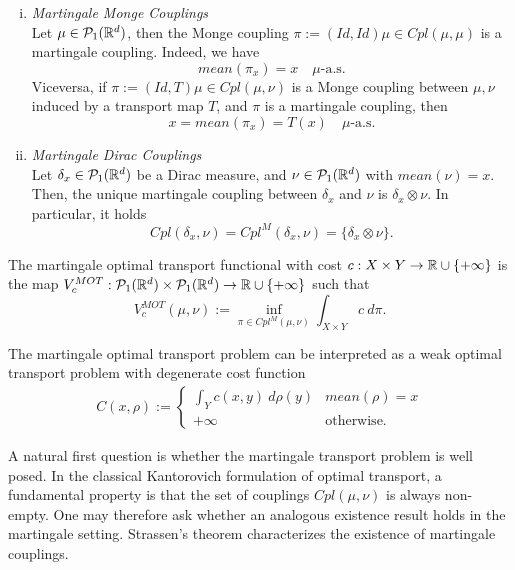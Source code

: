 \documentclass[../main.tex]{subfiles}
\begin{document}
\begin{example} \hfill
    \begin{enumerate}[(i)]
        \item \textit{Martingale Monge Couplings} \\
        Let $\mu\in\mathcal{P}_1(\mathbb{R}^d)$, then the Monge coupling $\pi:=(Id, Id)\mu\in Cpl(\mu, \mu)$ is a martingale coupling. Indeed, we have
        $$
        mean(\pi_x) = x \quad \mu\text{-a.s.}
        $$
        Viceversa, if $\pi:=(Id, T)\mu\in Cpl(\mu, \nu)$ is a Monge coupling between $\mu, \nu$ induced by a transport map $T$, and $\pi$ is a martingale coupling, then
        $$
        x = mean(\pi_x) = T(x) \quad \mu\text{-a.s.}
        $$
        \item \textit{Martingale Dirac Couplings} \\
        Let $\delta_x\in\mathcal{P}_1(\mathbb{R}^d)$ be a Dirac measure, and $\nu\in\mathcal{P}_1(\mathbb{R}^d)$ with $mean(\nu)=x$. Then, the unique martingale coupling between $\delta_x$ and $\nu$ is $\delta_x\otimes\nu$. In particular, it holds
        $$
        Cpl(\delta_x, \nu) = Cpl^M(\delta_x, \nu) = \{\delta_x \otimes\nu\}.
        $$
    \end{enumerate}
\end{example}

\begin{definition}
    The martingale optimal transport functional with  cost $c : X \times Y \to \mathbb{R}\cup\{+\infty\}$ is the map $V^{MOT}_c : \mathcal{P}_1(\mathbb{R}^d)\times\mathcal{P}_1(\mathbb{R}^d)\to\mathbb{R}\cup\{+\infty\}$ such that
    $$
    V^{MOT}_c(\mu, \nu) := \inf_{\pi\in Cpl^M(\mu, \nu)} \int_{X\times Y} c \ d\pi.
    $$
\end{definition}

\begin{remark}
    The martingale optimal transport problem can be interpreted as a weak optimal transport problem with degenerate cost function 
    \begin{align*}
        C(x, \rho) :=
        \begin{cases}
            \int_Y c(x, y) \ d\rho(y) & mean(\rho)=x \\
            +\infty & \text{otherwise}.
        \end{cases} 
    \end{align*}
\end{remark}

A natural first question is whether the martingale transport problem is well posed. In the classical Kantorovich formulation of optimal transport, a fundamental property is that the set of couplings $Cpl(\mu,\nu)$ is always non-empty. One may therefore ask whether an analogous existence result holds in the martingale setting. Strassen's theorem characterizes the existence of martingale couplings.
\end{document}
